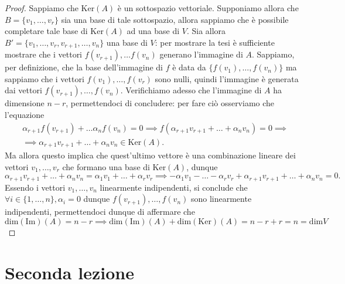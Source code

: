 \documentclass[12pt, twoside, italian, openany]{book}
\begin{document}
	\begin{proof}
		Sappiamo che $\text{Ker}(A)$ è un sottospazio vettoriale. Supponiamo allora che $B = \{ v_1, \ldots, v_r \}$ sia una base di tale sottospazio, allora sappiamo che è possibile completare tale base di $\text{Ker}(A)$ ad una base di $V$.
		Sia allora $B' = \{ v_1, \ldots, v_r, v_{r+1}, \ldots, v_n \}$ una base di $V$: per mostrare la tesi è sufficiente mostrare che i vettori $f(v_{r+1}), \ldots f(v_n)$ generano l'immagine di $A$. Sappiamo, per definizione, che la base dell'immagine
		di $f$ è data da $\{ f(v_1), \ldots, f(v_{n}) \}$ ma sappiamo che i vettori $f(v_1), \ldots, f(v_r)$ sono nulli, quindi l'immagine è generata dai vettori $f(v_{r+1}), \ldots, f(v_n)$. Verifichiamo adesso che l'immagine di $A$ ha dimensione $n-r$, permettendoci di concludere: per fare ciò osserviamo
		che l'equazione
		\begin{align*}
		&\alpha_{r+1} f(v_{r+1}) + \ldots \alpha_{n} f(v_n) = 0 \implies f(\alpha_{r+1} v_{r+1} + \ldots + \alpha_n v_n) = 0 \implies \\
		&\implies \alpha_{r+1} v_{r+1} + \ldots + \alpha_n v_n \in \text{Ker}(A).
		\end{align*}
		Ma allora questo implica che quest'ultimo vettore è una combinazione lineare dei vettori $v_1, \ldots, v_r$ che formano una base di $\text{Ker}(A)$, dunque
		$$
		\alpha_{r+1} v_{r+1} + \ldots + \alpha_n v_n = \alpha_1 v_1 + \ldots + \alpha_r v_r \implies -\alpha_1 v_1 - \ldots - \alpha_r v_r + \alpha_{r+1} v_{r+1} + \ldots + \alpha_n v_n = 0.
		$$
		Essendo i vettori $v_1, \ldots, v_n$ linearmente indipendenti, si conclude che $\forall i \in \{ 1, \ldots, n \}, \alpha_i = 0$ dunque $f(v_{r+1}),\ldots, f(v_{n})$ sono linearmente indipendenti, permettendoci dunque di affermare che $\text{dim}(\text{Im})(A) = n-r \implies \text{dim}(\text{Im})(A) + \text{dim}(\text{Ker})(A) = n - r + r = n = \text{dim}{V}$
	\end{proof}


	\chapter{Seconda lezione}
	\thispagestyle{empty}
	
\end{document}
